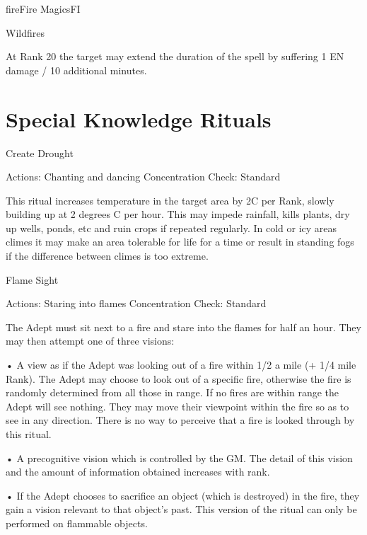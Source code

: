 \begin{College}[2.0]{fire}{Fire Magics}{FI}
\begin{spell}[S-14]{Wildfires}
\begin{effects}
At Rank 20 the target may extend the duration of the spell by
suffering 1 EN damage / 10 additional minutes.
\end{effects}
\end{spell}

\section{Special Knowledge Rituals}

\begin{ritual}[R-1]{Create Drought}

Actions: Chanting and dancing 
Concentration Check: Standard 
\begin{effects}
This ritual increases temperature in the target area by 2C per Rank,
slowly building up at 2 degrees C per hour. This may impede rainfall,
kills plants, dry up wells, ponds, etc and ruin crops if repeated
regularly.  In cold or icy areas climes it may make an area tolerable
for life for a time or result in standing fogs if the difference
between climes is too extreme.
\end{effects}
\end{ritual}

\begin{ritual}[R-2]{Flame Sight}

Actions: Staring into flames 
Concentration Check: Standard 
\begin{effects}
The Adept must sit next to a fire and stare into the flames for half
an hour.  They may then attempt one of three visions:

• A view as if the Adept was looking out of a fire within 1/2 a mile
(+ 1/4 mile Rank).  The Adept may choose to look out of a specific
fire, otherwise the fire is randomly determined from all those in
range.  If no fires are within range the Adept will see nothing.  They
may move their viewpoint within the fire so as to see in any
direction. There is no way to perceive that a fire is looked through
by this ritual.

• A precognitive vision which is controlled by the GM.  The detail of
this vision and the amount of information obtained increases with
rank.

• If the Adept chooses to sacrifice an object (which is destroyed) in
the fire, they gain a vision relevant to that object’s past.  This
version of the ritual can only be performed on flammable objects.
\end{effects}
\end{ritual}


\end{College}
